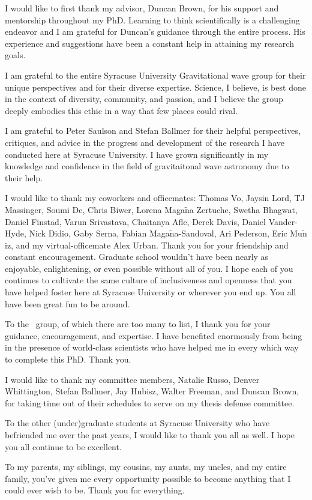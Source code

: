 I would like to first thank my advisor, Duncan Brown, for his support and mentorship throughout my PhD. Learning
to think scientifically is a challenging endeavor and I am grateful for Duncan's guidance through
the entire process. His experience and suggestions have been a constant help in attaining my research goals.

I am grateful to the entire Syracuse University Gravitational wave group for their unique perspectives and for their
diverse expertise. Science, I believe, is best done in the context of diversity, community, and passion, and I believe
the group deeply embodies this ethic in a way that few places could rival.

I am grateful to Peter Saulson and Stefan Ballmer for their helpful perspectives, critiques, and advice in the
progress and development of the research I have conducted here at Syracuse University. I
have grown significantly in my knowledge and confidence in the field of
gravitaitonal wave astronomy due to their help.

I would like to thank my coworkers and officemates: Thomas Vo, Jaysin Lord, TJ Massinger, Soumi De, Chris Biwer,
Lorena Maga$\tilde{\text{n}}$a Zertuche, Swetha Bhagwat, Daniel Finstad, Varun Srivastava,
Chaitanya Afle, Derek Davis, Daniel Vander-Hyde, Nick Didio, Gaby Serna,
Fabian Maga$\tilde{\text{n}}$a-Sandoval, Ari Pederson, Eric Mu$\tilde{\text{n}}$iz, and my virtual-officemate Alex Urban.
Thank you for your friendship and constant encouragement.
Graduate school wouldn't have been nearly as enjoyable, enlightening, or even possible without all of you.
I hope each of you continues to
cultivate the same culture of inclusiveness and openness that you have helped foster here at Syracuse University
or wherever you end up. You all have been great fun to be around.

To the \pycbc{}\ group, of which there are too many to list, I thank you for your guidance, encouragement, and
expertise. I have benefited enormously from being in the presence of world-class scientists who have helped
me in every which way to complete this PhD. Thank you. 

I would like to thank my committee members, Natalie Russo, Denver Whittington, Stefan Ballmer, Jay Hubisz, Walter Freeman, 
and Duncan Brown, for taking time out of their schedules to serve on my thesis defense committee.

To the other (under)graduate students at Syracuse University who have befriended me over the past years, I would
like to thank you all as well. I hope you all continue to be excellent. 

To my parents, my siblings, my cousins, my aunts, my uncles, and my entire family, you've given me every opportunity
possible to become anything that I could ever wish to be. Thank you for everything.
